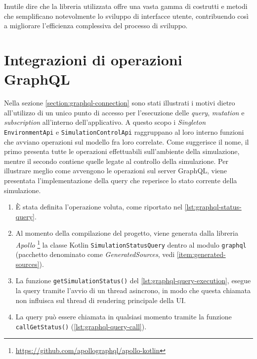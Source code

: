 Inutile dire che la libreria utilizzata offre una vasta gamma di costrutti e metodi che semplificano notevolmente lo sviluppo di interfacce utente, contribuendo così a migliorare l'efficienza complessiva del processo di sviluppo.

\section{Integrazioni di operazioni GraphQL}
Nella sezione \ref{section:graphql-connection} sono stati illustrati i motivi dietro all'utilizzo di un unico punto di accesso per l'esecuzione delle \textit{query}, \textit{mutation} e \textit{subscription} all'interno dell'applicativo. A questo scopo i \textit{Singleton} \texttt{EnvironmentApi} e \texttt{SimulationControlApi} raggruppano al loro interno funzioni che avviano operazioni sul modello fra loro correlate.
Come suggerisce il nome, il primo presenta tutte le operazioni effettuabili sull'ambiente della simulazione, mentre il secondo contiene quelle legate al controllo della simulazione.
Per illustrare meglio come avvengono le operazioni sul server GraphQL, viene presentata l'implementazione della query che reperisce lo stato corrente della simulazione.
\begin{enumerate}
	\item È stata definita l'operazione voluta, come riportato nel \cref{lst:graphql-status-query}. 
	
	\item Al momento della compilazione del progetto, viene generata dalla libreria \textit{Apollo} \footnote{\url{https://github.com/apollographql/apollo-kotlin}} la classe Kotlin \texttt{SimulationStatusQuery} dentro al modulo \texttt{graphql} (pacchetto denominato come \textit{GeneratedSources}, vedi \ref{item:generated-sources}).
	\item La funzione \texttt{getSimulationStatus()} del \cref{lst:graphql-query-execution}, esegue la query tramite l'avvio di un thread asincrono, in modo che questa chiamata non influisca sul thread di rendering principale della \ac{UI}.
	
	\item La query può essere chiamata in qualsiasi momento tramite la funzione \newline \texttt{callGetStatus()} (\cref{lst:graphql-query-call}).
	
	
\end{enumerate}
